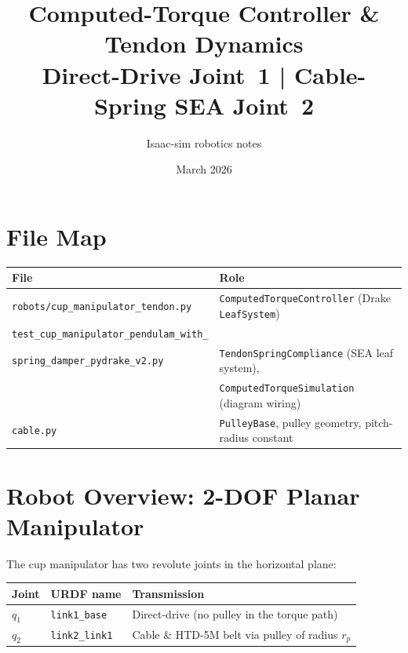 \documentclass[11pt, a4paper]{article}
\title{\textbf{Computed-Torque Controller \& Tendon Dynamics}\\
       \large Direct-Drive Joint~1 \;|\; Cable-Spring SEA Joint~2}
\date{March 2026}
\author{Isaac-sim robotics notes}
\newcommand{\rp}{r_p}
\begin{document}
\maketitle
\tableofcontents
\bigskip

\section{File Map}

\begin{center}
\begin{tabular}{ll}
\toprule
\textbf{File} & \textbf{Role} \\
\midrule
\texttt{robots/cup\_manipulator\_tendon.py}
  & \texttt{ComputedTorqueController} (Drake \texttt{LeafSystem}) \\
\texttt{test\_cup\_manipulator\_pendulam\_with\_} & \\
\quad\texttt{spring\_damper\_pydrake\_v2.py}
  & \texttt{TendonSpringCompliance} (SEA leaf system), \\
  & \texttt{ComputedTorqueSimulation} (diagram wiring) \\
\texttt{cable.py}
  & \texttt{PulleyBase}, pulley geometry, pitch-radius constant \\
\bottomrule
\end{tabular}
\end{center}

\section{Robot Overview: 2-DOF Planar Manipulator}

The cup manipulator has two revolute joints in the horizontal plane:

\begin{center}
\begin{tabular}{lll}
\toprule
\textbf{Joint} & \textbf{URDF name} & \textbf{Transmission} \\
\midrule
$q_1$ & \texttt{link1\_base}  & Direct-drive (no pulley in the torque path) \\
$q_2$ & \texttt{link2\_link1} & Cable \& HTD-5M belt via pulley of radius $\rp$ \\
\bottomrule
\end{tabular}
\end{center}
\end{document}
